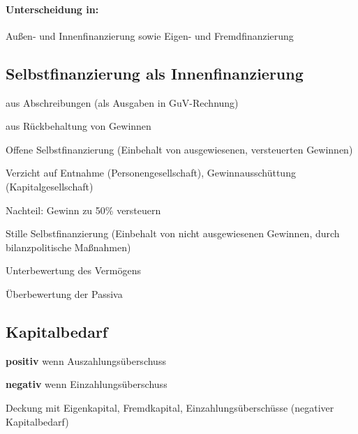 \paragraph{Unterscheidung in:} Außen- und Innenfinanzierung sowie Eigen- und Fremdfinanzierung


\clearpage
\subsection{Selbstfinanzierung als Innenfinanzierung}
\begin{compactitem}
	\item aus Abschreibungen (als Ausgaben in GuV-Rechnung)
	\item aus Rückbehaltung von Gewinnen
	\begin{compactitem}
		\item Offene Selbstfinanzierung (Einbehalt von ausgewiesenen, versteuerten Gewinnen)
		\begin{compactitem}
			\item Verzicht auf Entnahme (Personengesellschaft), Gewinnausschüttung (Kapitalgesellschaft)
			\item Nachteil: Gewinn zu 50\% versteuern
		\end{compactitem}
		\item Stille Selbstfinanzierung (Einbehalt von nicht ausgewiesenen Gewinnen, durch bilanzpolitische Maßnahmen)
		\begin{compactitem}
			\item Unterbewertung des Vermögens
			\item Überbewertung der Passiva
		\end{compactitem}
	\end{compactitem}
\end{compactitem}

\clearpage
\subsection{Kapitalbedarf}
\begin{compactitem}
	\item {\bf positiv} wenn Auszahlungsüberschuss
	\item {\bf negativ} wenn Einzahlungsüberschuss
\end{compactitem}

Deckung mit Eigenkapital, Fremdkapital, Einzahlungsüberschüsse (negativer Kapitalbedarf)

